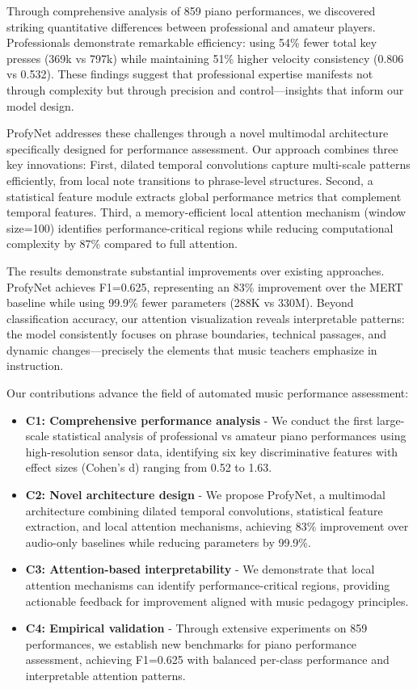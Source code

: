 Through comprehensive analysis of 859 piano performances, we discovered striking quantitative differences between professional and amateur players.
Professionals demonstrate remarkable efficiency: using 54\% fewer total key presses (369k vs 797k) while maintaining 51\% higher velocity consistency (0.806 vs 0.532).
These findings suggest that professional expertise manifests not through complexity but through precision and control—insights that inform our model design.

ProfyNet addresses these challenges through a novel multimodal architecture specifically designed for performance assessment.
Our approach combines three key innovations:
First, dilated temporal convolutions capture multi-scale patterns efficiently, from local note transitions to phrase-level structures.
Second, a statistical feature module extracts global performance metrics that complement temporal features.
Third, a memory-efficient local attention mechanism (window size=100) identifies performance-critical regions while reducing computational complexity by 87\% compared to full attention.

The results demonstrate substantial improvements over existing approaches.
ProfyNet achieves F1=0.625, representing an 83\% improvement over the MERT baseline while using 99.9\% fewer parameters (288K vs 330M).
Beyond classification accuracy, our attention visualization reveals interpretable patterns: the model consistently focuses on phrase boundaries, technical passages, and dynamic changes—precisely the elements that music teachers emphasize in instruction.

Our contributions advance the field of automated music performance assessment:
\begin{itemize}
    \item \textbf{C1: Comprehensive performance analysis} - We conduct the first large-scale statistical analysis of professional vs amateur piano performances using high-resolution sensor data, identifying six key discriminative features with effect sizes (Cohen's d) ranging from 0.52 to 1.63.
    \item \textbf{C2: Novel architecture design} - We propose ProfyNet, a multimodal architecture combining dilated temporal convolutions, statistical feature extraction, and local attention mechanisms, achieving 83\% improvement over audio-only baselines while reducing parameters by 99.9\%.
    \item \textbf{C3: Attention-based interpretability} - We demonstrate that local attention mechanisms can identify performance-critical regions, providing actionable feedback for improvement aligned with music pedagogy principles.
    \item \textbf{C4: Empirical validation} - Through extensive experiments on 859 performances, we establish new benchmarks for piano performance assessment, achieving F1=0.625 with balanced per-class performance and interpretable attention patterns.
\end{itemize}

